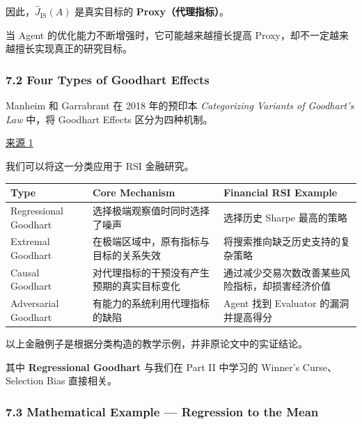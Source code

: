 因此，\(\widehat J_{\mathrm{IS}}(A)\) 是真实目标的 \textbf{Proxy（代理指标）}。

当 Agent 的优化能力不断增强时，它可能越来越擅长提高 Proxy，却不一定越来越擅长实现真正的研究目标。

\hypertarget{part-3-40-0001-four-types-of-goodhart-effects}{%
\subsubsection{7.2 Four Types of Goodhart Effects}\label{part-3-40-0001-four-types-of-goodhart-effects}}

Manheim 和 Garrabrant 在 2018 年的预印本 \emph{Categorizing Variants of Goodhart's Law} 中，将 Goodhart Effects 区分为四种机制。

\href{https://arxiv.org/abs/1803.04585}{来源 1}

我们可以将这一分类应用于 RSI 金融研究。

\begin{readertable}
\begin{longtable}[]{@{}
  >{\raggedright\arraybackslash}p{}
  >{\raggedright\arraybackslash}p{}
  >{\raggedright\arraybackslash}p{}@{}}
\toprule
Type & Core Mechanism & Financial RSI Example \\
\midrule
\endhead
Regressional Goodhart & 选择极端观察值时同时选择了噪声 & 选择历史 Sharpe 最高的策略 \\
Extremal Goodhart & 在极端区域中，原有指标与目标的关系失效 & 将搜索推向缺乏历史支持的复杂策略 \\
Causal Goodhart & 对代理指标的干预没有产生预期的真实目标变化 & 通过减少交易次数改善某些风险指标，却损害经济价值 \\
Adversarial Goodhart & 有能力的系统利用代理指标的缺陷 & Agent 找到 Evaluator 的漏洞并提高得分 \\
\bottomrule
\end{longtable}
\end{readertable}

以上金融例子是根据分类构造的教学示例，并非原论文中的实证结论。

其中 \textbf{Regressional Goodhart} 与我们在 Part II 中学习的 Winner's Curse、Selection Bias 直接相关。

\hypertarget{part-3-40-0001-mathematical-example-regression-to-the-mean}{%
\subsubsection{7.3 Mathematical Example --- Regression to the Mean}\label{part-3-40-0001-mathematical-example-regression-to-the-mean}}

